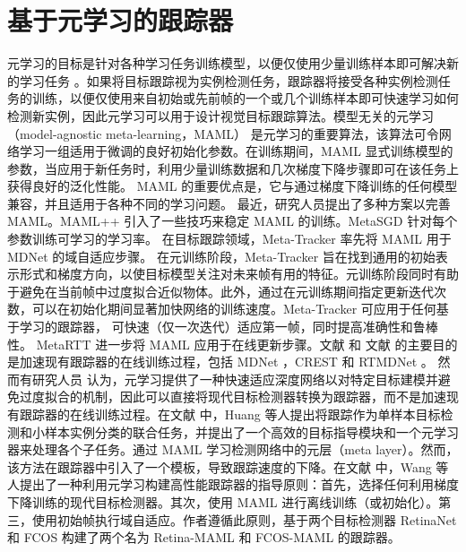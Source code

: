 \section{基于元学习的跟踪器} %
元学习的目标是针对各种学习任务训练模型，以便仅使用少量训练样本即可解决新的学习任务 \cite{MAML}。如果将目标跟踪视为实例检测任务，跟踪器将接受各种实例检测任务的训练，以便仅使用来自初始或先前帧的一个或几个训练样本即可快速学习如何检测新实例，因此元学习可以用于设计视觉目标跟踪算法。模型无关的元学习（model-agnostic meta-learning，MAML）\cite{MAML} 是元学习的重要算法，该算法可令网络学习一组适用于微调的良好初始化参数。在训练期间，MAML 显式训练模型的参数，当应用于新任务时，利用少量训练数据和几次梯度下降步骤即可在该任务上获得良好的泛化性能。 MAML 的重要优点是，它与通过梯度下降训练的任何模型兼容，并且适用于各种不同的学习问题。
最近，研究人员提出了多种方案以完善 MAML。MAML++ \cite{MAML++} 引入了一些技巧来稳定 MAML 的训练。MetaSGD \cite{MetaSGD} 针对每个参数训练可学习的学习率。
在目标跟踪领域，Meta-Tracker \cite{MetaTracker} 率先将 MAML 用于 MDNet \cite{MDNet} 的域自适应步骤。
在元训练阶段，Meta-Tracker 旨在找到通用的初始表示形式和梯度方向，以使目标模型关注对未来帧有用的特征。元训练阶段同时有助于避免在当前帧中过度拟合近似物体。此外，通过在元训练期间指定更新迭代次数，可以在初始化期间显著加快网络的训练速度。Meta-Tracker 可应用于任何基于学习的跟踪器，
可快速（仅一次迭代）适应第一帧，同时提高准确性和鲁棒性。
MetaRTT \cite{MetaRTT} 进一步将 MAML 应用于在线更新步骤。文献 \cite{MetaTracker} 和 文献 \cite{MetaRTT} 的主要目的是加速现有跟踪器的在线训练过程，包括 MDNet \cite{MDNet}，CREST \cite{CREST} 和 RTMDNet \cite{RTMDNet}。
然而有研究人员 \cite{huang2019bridging} 认为，元学习提供了一种快速适应深度网络以对特定目标建模并避免过度拟合的机制，因此可以直接将现代目标检测器转换为跟踪器，而不是加速现有跟踪器的在线训练过程。在文献 \cite{huang2019bridging} 中，Huang 等人提出将跟踪作为单样本目标检测和小样本实例分类的联合任务，并提出了一个高效的目标指导模块和一个元学习器来处理各个子任务。通过 MAML 学习检测网络中的元层（meta layer）。然而，该方法在跟踪器中引入了一个模板，导致跟踪速度的下降。在文献 \cite{TrackingBy} 中，Wang 等人提出了一种利用元学习构建高性能跟踪器的指导原则：首先，选择任何利用梯度下降训练的现代目标检测器。其次，使用 MAML 进行离线训练（或初始化）。第三，使用初始帧执行域自适应。作者遵循此原则，基于两个目标检测器 RetinaNet \cite{focal} 和 FCOS \cite{tian2019fcos} 构建了两个名为 Retina-MAML 和 FCOS-MAML 的跟踪器。
